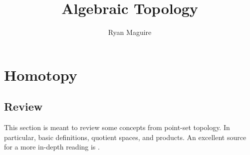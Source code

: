 \documentclass{book}                                                           %
\begin{document}
    \title{Algebraic Topology}
    \author{Ryan Maguire}
    \date{\vspace{-5ex}}
    \maketitle
    \tableofcontents
    \listoffigures
    \chapter{Homotopy}
        \section{Review}
            This section is meant to review some concepts from point-set
            topology. In particular, basic definitions, quotient spaces, and
            products. An excellent source for a more in-depth reading is
            \cite{Munkres2000}.
\end{document}
